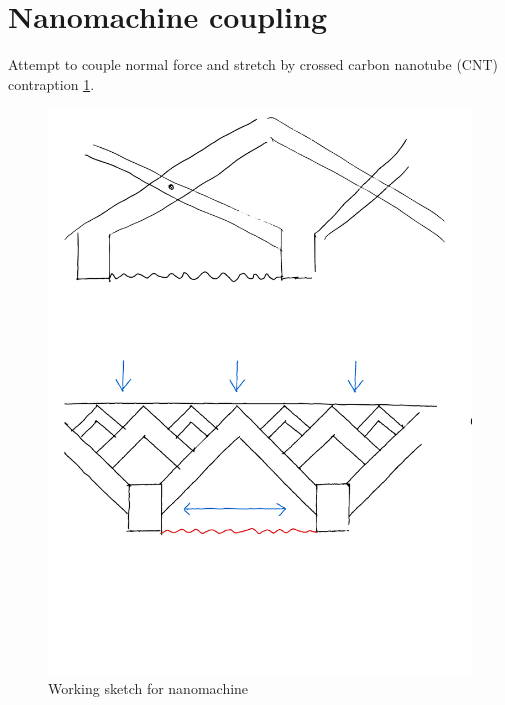 \section{Nanomachine coupling}
Attempt to couple normal force and stretch by crossed carbon nanotube (CNT) contraption \ref{fig:nanomachine}. 


\begin{figure}[H]
  \centering
  \includegraphics[width=0.5\linewidth]{figures/negative_coefficient/nanomachine.pdf}
  \caption{Working sketch for nanomachine}
  \label{fig:nanomachine}
\end{figure}



